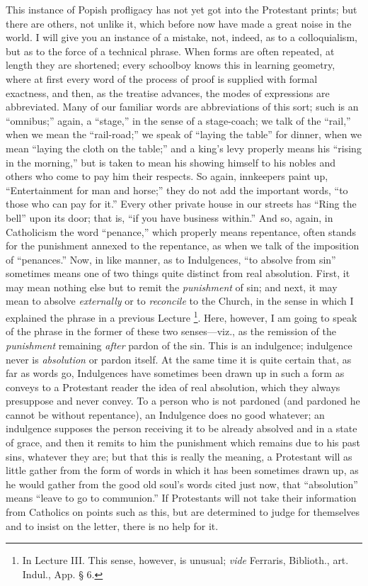 This instance of Popish profligacy has not yet got
into the Protestant prints; but there are others, not
unlike it, which before now have made a great noise in
the world. I will give you an instance of a mistake, not,
indeed, as to a colloquialism, but as to the force of a
technical phrase. When forms are often repeated, at
length they are shortened; every schoolboy knows this in
learning geometry, where at first every word of the
process of proof is supplied with formal exactness, and
then, as the treatise advances, the modes of expressions
are abbreviated. Many of our familiar words are
abbreviations of this sort; such is an
``omnibus;'' again, a ``stage,'' in the
sense of a stage-coach; we talk of the ``rail,''
when we mean the ``rail-road;'' we speak of
``laying the table'' for dinner, when we mean
``laying the cloth on the table;'' and a king's
levy properly means his ``rising in the
morning,'' but is taken to mean his showing himself
to his nobles and others who come to pay him their
respects. So again, innkeepers paint up,
``Entertainment for man and horse;'' they do not
add the important words, ``to those who can pay for
it.'' Every other private house in our streets has
``Ring the bell'' upon its door; that is,
``if you have business within.'' And so, again,
in Catholicism the word ``penance,'' which
properly means repentance, often stands for the
punishment annexed to the repentance, as when we talk of
the imposition of ``penances.'' Now, in like
manner, as to Indulgences, ``to absolve from
sin'' sometimes means one of two things quite
distinct from real absolution. First, it may mean nothing
else but to remit the \emph{punishment} of sin; and
next, it may mean to absolve \emph{externally} or to \emph{reconcile}
to the Church, in the sense in which I explained the
phrase in a previous Lecture \footnote{In Lecture III. This sense,
however, is unusual; \emph{vide} Ferraris, Biblioth.,
art. Indul., App. § 6.}. Here, however, I am going to
speak of the phrase in the former of these two senses—viz., as the remission of the \emph{punishment}
remaining \emph{after} pardon of the sin. This is an
indulgence; indulgence never is \emph{absolution} or
pardon itself. At the same time it is quite certain that,
as far as words go, Indulgences have sometimes been drawn
up in such a form as conveys to a Protestant reader the
idea of real absolution, which they always presuppose and
never convey. To a person who is not pardoned (and
pardoned he cannot be without repentance), an Indulgence
does no good whatever; an indulgence supposes the person
receiving it to be already absolved and in a state of
grace, and then it remits to him the punishment which
remains due to his past sins, whatever they are; but that
this is really the meaning, a Protestant will as little
gather from the form of words in which it has been
sometimes drawn up, as he would gather from the good old
soul's words cited just now, that ``absolution''
means ``leave to go to communion.'' If
Protestants will not take their information from
Catholics on points such as this, but are determined to
judge for themselves and to insist on the letter, there
is no help for it.

